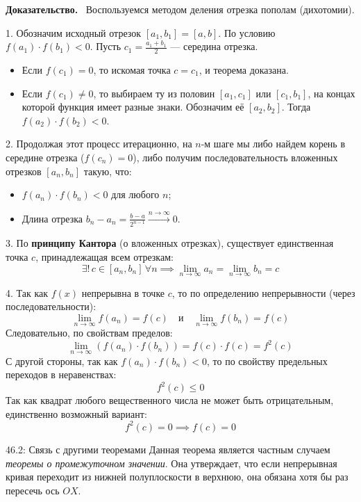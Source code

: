 \documentclass[a4paper,12pt]{article}
\newcommand{\myproof}{\textbf{Доказательство.}\ }
\begin{document}
	\myproof
	Воспользуемся методом деления отрезка пополам (дихотомии).
	
	1. Обозначим исходный отрезок $[a_1, b_1] = [a, b]$. По условию $f(a_1) \cdot f(b_1) < 0$.
	Пусть $c_1 = \frac{a_1 + b_1}{2}$ — середина отрезка.
	\begin{itemize}
		\item Если $f(c_1) = 0$, то искомая точка $c = c_1$, и теорема доказана.
		\item Если $f(c_1) \neq 0$, то выбираем ту из половин $[a_1, c_1]$ или $[c_1, b_1]$, на концах которой функция имеет разные знаки. Обозначим её $[a_2, b_2]$. Тогда $f(a_2) \cdot f(b_2) < 0$.
	\end{itemize}
	
	2. Продолжая этот процесс итерационно, на $n$-м шаге мы либо найдем корень в середине отрезка ($f(c_n) = 0$), либо получим последовательность вложенных отрезков $[a_n, b_n]$ такую, что:
	\begin{itemize}
		\item $f(a_n) \cdot f(b_n) < 0$ для любого $n$;
		\item Длина отрезка $b_n - a_n = \frac{b-a}{2^{n-1}} \xrightarrow{n \to \infty} 0$.
	\end{itemize}
	
	3. По \textbf{принципу Кантора} (о вложенных отрезках), существует единственная точка $c$, принадлежащая всем отрезкам:
	$$ \exists! \, c \in [a_n, b_n] \, \forall n \implies \lim_{n \to \infty} a_n = \lim_{n \to \infty} b_n = c $$
	
	4. Так как $f(x)$ непрерывна в точке $c$, то по определению непрерывности (через последовательности):
	$$ \lim_{n \to \infty} f(a_n) = f(c) \quad \text{и} \quad \lim_{n \to \infty} f(b_n) = f(c) $$
	Следовательно, по свойствам пределов:
	$$ \lim_{n \to \infty} (f(a_n) \cdot f(b_n)) = f(c) \cdot f(c) = f^2(c) $$
	С другой стороны, так как $f(a_n) \cdot f(b_n) < 0$, то по свойству предельных переходов в неравенствах:
	$$ f^2(c) \leq 0 $$
	Так как квадрат любого вещественного числа не может быть отрицательным, единственно возможный вариант:
	$$ f^2(c) = 0 \implies f(c) = 0 $$

	
	\begin{notebook}{46.2: Связь с другими теоремами}
		Данная теорема является частным случаем \textit{теоремы о промежуточном значении}. Она утверждает, что если непрерывная кривая переходит из нижней полуплоскости в верхнюю, она обязана хотя бы раз пересечь ось $OX$.
	\end{notebook}
	
\end{document}
